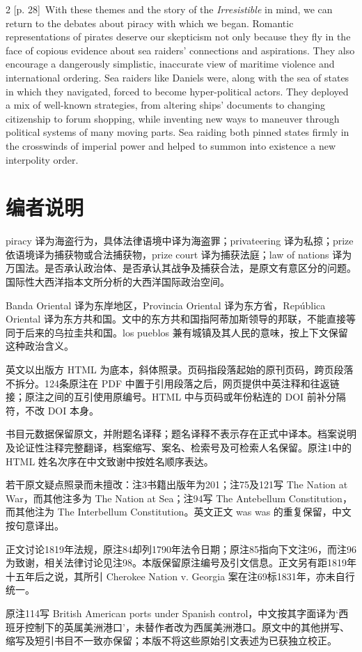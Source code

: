 \documentclass[10pt,a4paper]{article}
\begin{document}
\begin{paracol}{2}
\switchcolumn
{\scriptsize\color{gray} [p. 28]}\ With these themes and the story of the \textit{Irresistible} in mind, we can return to the debates about piracy with which we began. Romantic representations of pirates deserve our skepticism not only because they fly in the face of copious evidence about sea raiders’ connections and aspirations. They also encourage a dangerously simplistic, inaccurate view of maritime violence and international ordering. Sea raiders like Daniels were, along with the sea of states in which they navigated, forced to become hyper-political actors. They deployed a mix of well-known strategies, from altering ships’ documents to changing citizenship to forum shopping, while inventing new ways to maneuver through political systems of many moving parts. Sea raiding both pinned states firmly in the crosswinds of imperial power and helped to summon into existence a new interpolity order.\par
\switchcolumn*
\end{paracol}
\section*{编者说明}
piracy 译为海盗行为，具体法律语境中译为海盗罪；privateering 译为私掠；prize 依语境译为捕获物或合法捕获物，prize court 译为捕获法庭；law of nations 译为万国法。是否承认政治体、是否承认其战争及捕获合法，是原文有意区分的问题。国际性大西洋指本文所分析的大西洋国际政治空间。\par
Banda Oriental 译为东岸地区，Provincia Oriental 译为东方省，República Oriental 译为东方共和国。文中的东方共和国指阿蒂加斯领导的邦联，不能直接等同于后来的乌拉圭共和国。los pueblos 兼有城镇及其人民的意味，按上下文保留这种政治含义。\par
英文以出版方 HTML 为底本，斜体照录。页码指段落起始的原刊页码，跨页段落不拆分。124条原注在 PDF 中置于引用段落之后，网页提供中英注释和往返链接；原注之间的互引使用原编号。HTML 中与页码或年份粘连的 DOI 前补分隔符，不改 DOI 本身。\par
书目元数据保留原文，并附题名译释；题名译释不表示存在正式中译本。档案说明及论证性注释完整翻译，档案缩写、案名、检索号及可检索人名保留。原注1中的 HTML 姓名次序在中文致谢中按姓名顺序表达。\par
若干原文疑点照录而未擅改：注3书籍出版年为201；注75及121写 The Nation at War，而其他注多为 The Nation at Sea；注94写 The Antebellum Constitution，而其他注为 The Interbellum Constitution。英文正文 was was 的重复保留，中文按句意译出。\par
正文讨论1819年法规，原注84却列1790年法令日期；原注85指向下文注96，而注96为致谢，相关法律讨论见注98。本版保留原注编号及引文信息。正文另有距1819年十五年后之说，其所引 Cherokee Nation v. Georgia 案在注69标1831年，亦未自行统一。\par
原注114写 British American ports under Spanish control，中文按其字面译为‘西班牙控制下的英属美洲港口’，未替作者改为西属美洲港口。原文中的其他拼写、缩写及短引书目不一致亦保留；本版不将这些原始引文表述为已获独立校正。\par
\end{document}
